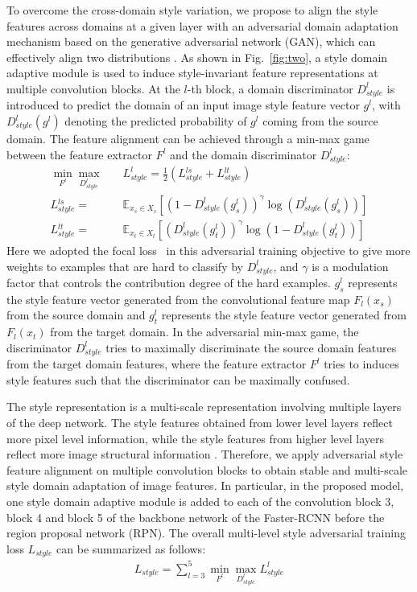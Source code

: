 \documentclass[runningheads]{llncs}
\begin{document}
To overcome the cross-domain style variation, we propose to align the style features across domains at a given layer
with an adversarial domain adaptation mechanism based on 
the generative adversarial network (GAN), 
which can effectively align two distributions
\cite{goodfellow2014generative}. 
As shown in Fig.~\ref{fig:two}, a style domain adaptive module is used to induce style-invariant feature representations
at multiple convolution blocks. 
At the $l$-th block, a domain discriminator 
$D^l_{style}$ is introduced to predict the domain of an input image style feature vector $g^l$, 
with $D^l_{style}(g^l)$ denoting the predicted probability of $g^l$ coming from the source domain. 
The feature alignment can be achieved through a min-max game between
the feature extractor $F^l$ and the domain discriminator $D^l_{style}$: 
\begin{align}
\label{eq2}
	\min_{F^l} \max_{D^l_{style}} &\quad   L_{style}^l =   \frac{1}{2}(L{_{style}^{ls}} + L{_{style}^{lt}})
\\
	L{_{style}^{ls}} = &  \quad \mathbb{E}_{x_s\in X_s}\left[ {{{(1 - D_{style}^l(g_s^l))}^\gamma }\log (D_{style}^l(g_s^l))}\right]
\\
	L{_{style}^{lt}} = &  \quad \mathbb{E}_{x_t\in X_t} \left[{{{(D_{style}^l(g_t^l))}^\gamma }\log (1-D_{style}^l(g_t^l))}\right]
\end{align}
Here we adopted the focal loss~\cite{lin2017focal,saito2019strong} in this adversarial training objective
to give more weights to examples that are hard to classify by $D^l_{style}$,
and $\gamma$ is a modulation factor that controls the contribution degree of the hard examples.
$g_s^l$ represents the style feature vector generated 
from the convolutional feature map $F_l(x_s)$ from the source domain 
and $g_t^l$ represents the style feature vector generated from $F_l(x_t)$
from the target domain. 
In the adversarial min-max game, the discriminator $D^l_{style}$ tries to maximally
discriminate the source domain features from the target domain features,
where the feature extractor $F^l$ tries to induces style features such that
the discriminator can be maximally confused.  


The style representation is a multi-scale representation involving multiple layers of the deep network.
The style features obtained from lower level layers reflect more pixel level information,
while the style features from higher level layers reflect more image structural information
\cite{Gatys2016Image,JohnsonPerceptual}. 
Therefore, we apply adversarial style feature alignment on multiple convolution blocks 
to obtain stable and multi-scale style domain adaptation of image features. 
In particular, in the proposed model, one style domain adaptive module is 
added to each of the convolution block 3, block 4 and block 5 of the backbone network of 
the Faster-RCNN before the region proposal network (RPN).
The overall multi-level style adversarial training loss $L_{style}$ can be summarized as follows:
\begin{align}
\label{eq5}
{L_{style}} = \sum\nolimits_{l = 3}^5 {\mathop {\min }\limits_{{F^l}} \mathop {\max }\limits_{D_{style}^l} L_{style}^l}
\end{align}
\end{document}
